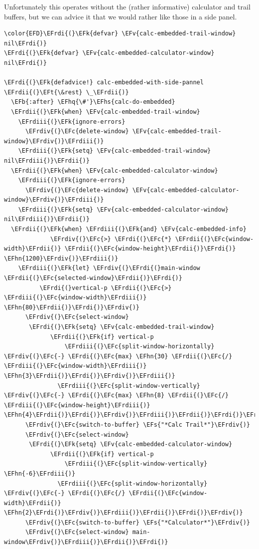 \documentclass{scrartcl}
\newcommand{\EFk}[1]{\textcolor{EFk}{#1}} %
\newcommand{\EFt}[1]{\textcolor{EFt}{#1}} %
\newcommand{\EFs}[1]{\textcolor{EFs}{#1}} %
\newcommand{\EFb}[1]{\textcolor{EFb}{#1}} %
\newcommand{\EFc}[1]{\textcolor{EFc}{#1}} %
\newcommand{\EFv}[1]{\textcolor{EFv}{#1}} %
\newcommand{\EFhn}[1]{#1} %
\newcommand{\EFhq}[1]{#1} %
\newcommand{\EFhs}[1]{#1} %
\newcommand{\EFrdi}[1]{#1} %
\newcommand{\EFrdii}[1]{#1} %
\newcommand{\EFrdiii}[1]{#1} %
\newcommand{\EFrdiv}[1]{#1} %
\begin{document}
Unfortunately this operates without the (rather informative) calculator and
trail buffers, but we can advice it that we would rather like those in a side
panel.

\begin{Code}
\begin{Verbatim}[]
\color{EFD}\EFrdi{(}\EFk{defvar} \EFv{calc-embedded-trail-window} nil\EFrdi{)}
\EFrdi{(}\EFk{defvar} \EFv{calc-embedded-calculator-window} nil\EFrdi{)}

\EFrdi{(}\EFk{defadvice!} calc-embedded-with-side-pannel \EFrdii{(}\EFt{\&rest} \_\EFrdii{)}
  \EFb{:after} \EFhq{\#'}\EFhs{calc-do-embedded}
  \EFrdii{(}\EFk{when} \EFv{calc-embedded-trail-window}
    \EFrdiii{(}\EFk{ignore-errors}
      \EFrdiv{(}\EFc{delete-window} \EFv{calc-embedded-trail-window}\EFrdiv{)}\EFrdiii{)}
    \EFrdiii{(}\EFk{setq} \EFv{calc-embedded-trail-window} nil\EFrdiii{)}\EFrdii{)}
  \EFrdii{(}\EFk{when} \EFv{calc-embedded-calculator-window}
    \EFrdiii{(}\EFk{ignore-errors}
      \EFrdiv{(}\EFc{delete-window} \EFv{calc-embedded-calculator-window}\EFrdiv{)}\EFrdiii{)}
    \EFrdiii{(}\EFk{setq} \EFv{calc-embedded-calculator-window} nil\EFrdiii{)}\EFrdii{)}
  \EFrdii{(}\EFk{when} \EFrdiii{(}\EFk{and} \EFv{calc-embedded-info}
             \EFrdiv{(}\EFc{>} \EFrdi{(}\EFc{*} \EFrdii{(}\EFc{window-width}\EFrdii{)} \EFrdii{(}\EFc{window-height}\EFrdii{)}\EFrdi{)} \EFhn{1200}\EFrdiv{)}\EFrdiii{)}
    \EFrdiii{(}\EFk{let} \EFrdiv{(}\EFrdi{(}main-window \EFrdii{(}\EFc{selected-window}\EFrdii{)}\EFrdi{)}
          \EFrdi{(}vertical-p \EFrdii{(}\EFc{>} \EFrdiii{(}\EFc{window-width}\EFrdiii{)} \EFhn{80}\EFrdii{)}\EFrdi{)}\EFrdiv{)}
      \EFrdiv{(}\EFc{select-window}
       \EFrdi{(}\EFk{setq} \EFv{calc-embedded-trail-window}
             \EFrdii{(}\EFk{if} vertical-p
                 \EFrdiii{(}\EFc{split-window-horizontally} \EFrdiv{(}\EFc{-} \EFrdi{(}\EFc{max} \EFhn{30} \EFrdii{(}\EFc{/} \EFrdiii{(}\EFc{window-width}\EFrdiii{)} \EFhn{3}\EFrdii{)}\EFrdi{)}\EFrdiv{)}\EFrdiii{)}
               \EFrdiii{(}\EFc{split-window-vertically} \EFrdiv{(}\EFc{-} \EFrdi{(}\EFc{max} \EFhn{8} \EFrdii{(}\EFc{/} \EFrdiii{(}\EFc{window-height}\EFrdiii{)} \EFhn{4}\EFrdii{)}\EFrdi{)}\EFrdiv{)}\EFrdiii{)}\EFrdii{)}\EFrdi{)}\EFrdiv{)}
      \EFrdiv{(}\EFc{switch-to-buffer} \EFs{"*Calc Trail*"}\EFrdiv{)}
      \EFrdiv{(}\EFc{select-window}
       \EFrdi{(}\EFk{setq} \EFv{calc-embedded-calculator-window}
             \EFrdii{(}\EFk{if} vertical-p
                 \EFrdiii{(}\EFc{split-window-vertically} \EFhn{-6}\EFrdiii{)}
               \EFrdiii{(}\EFc{split-window-horizontally} \EFrdiv{(}\EFc{-} \EFrdi{(}\EFc{/} \EFrdii{(}\EFc{window-width}\EFrdii{)} \EFhn{2}\EFrdi{)}\EFrdiv{)}\EFrdiii{)}\EFrdii{)}\EFrdi{)}\EFrdiv{)}
      \EFrdiv{(}\EFc{switch-to-buffer} \EFs{"*Calculator*"}\EFrdiv{)}
      \EFrdiv{(}\EFc{select-window} main-window\EFrdiv{)}\EFrdiii{)}\EFrdii{)}\EFrdi{)}
\end{Verbatim}
\end{Code}
\end{document}
